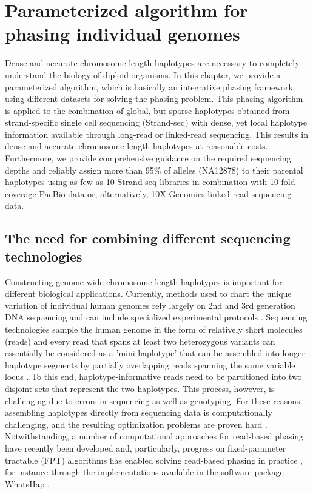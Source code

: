 \chapter{Parameterized algorithm for phasing individual genomes}\label{ref:chp2}
Dense and accurate chromosome-length haplotypes are necessary to completely understand the biology of diploid organisms.  
In this chapter, we provide a parameterized algorithm, which is basically an integrative phasing framework using different datasets for solving the phasing problem. 
This phasing algorithm is applied to the combination of global, but sparse haplotypes obtained from strand-specific single cell sequencing (Strand-seq) with dense, yet local haplotype information available through long-read or linked-read sequencing.
This results in dense and accurate chromosome-length haplotypes at reasonable costs. 
Furthermore, we provide comprehensive guidance on the required sequencing depths and reliably assign more than 95\% of alleles (NA12878) to their parental haplotypes using as few as 10 Strand-seq libraries in combination with 10-fold coverage PacBio data or, alternatively, 10X Genomics linked-read sequencing data.

\section{The need for combining different sequencing technologies}
Constructing genome-wide chromosome-length haplotypes is important for different biological applications.
Currently, methods used to chart the unique variation of individual human genomes rely largely on 2nd and 3rd generation DNA sequencing and can include specialized experimental protocols \citep{Snyder2015, Porubsky2016, de2014targeted, amini2014haplotype, selvaraj2013whole}. 
Sequencing technologies sample the human genome in the form of relatively short molecules (reads) and every read that spans at least two heterozygous variants 
can essentially be considered as a 'mini haplotype' that can be assembled into longer haplotype segments by partially overlapping reads spanning the same variable locus \citep{Glusman2014}. 
To this end, haplotype-informative reads need to be partitioned into two disjoint sets that represent the two haplotypes. 
This process, however, is challenging due to errors in sequencing as well as genotyping. 
For these reasons assembling haplotypes directly from sequencing data is computationally challenging, and the resulting optimization problems are proven hard \citep{Cilibrasi2007, Lancia2001}. 
Notwithstanding, a number of computational approaches for read-based phasing have recently been developed \citep{rhee2016survey} 
and, particularly, progress on fixed-parameter tractable (FPT) algorithms has enabled solving read-based phasing in practice \citep{deng2013highly, Kuleshov2014, Patterson2015}, for instance through the implementations available in the software package WhatsHap \citep{martin2016whatshap}. 

